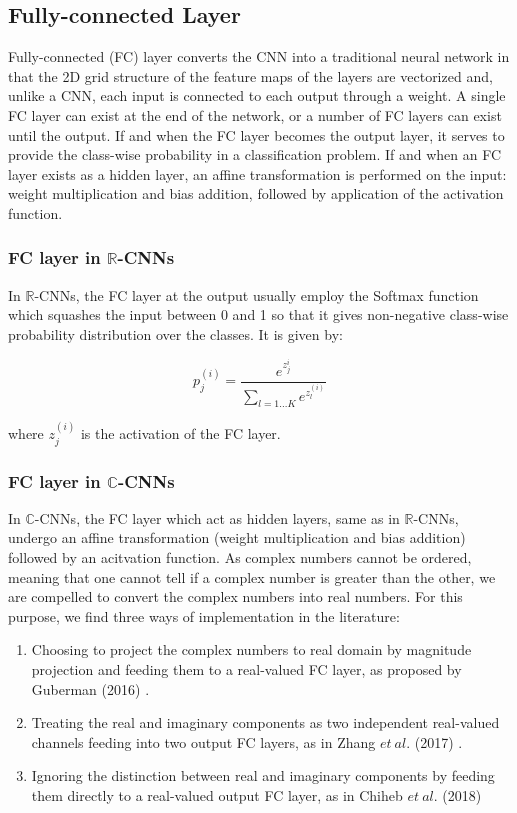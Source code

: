  \subsection{Fully-connected Layer}
 Fully-connected (FC) layer converts the CNN into a traditional neural network in that the 2D grid structure of the feature maps of the layers are vectorized and, unlike a CNN, each input is connected to each output through a weight. A single FC layer can exist at the end of the network, or a number of FC layers can exist until the output. If and when the FC layer becomes the output layer, it serves to provide the class-wise probability in a classification problem. If and when an FC layer exists as a hidden layer, an affine transformation is performed on the input: weight multiplication and bias addition, followed by application of the activation function.
 
  \subsubsection{FC layer in $\mathbb{R}$-CNNs}
 In $\mathbb{R}$-CNNs, the FC layer at the output usually employ the Softmax function which squashes the input between 0 and 1 so that it gives non-negative class-wise probability distribution over the classes. It is given by:
 
 
 
 \begin{equation} p_j^{(i)}=\frac{e^{z_j^i}}{\underset{l=1...K}{\sum}e^{z_l^{(i)}}} 
 \end{equation}
 
 where $z_j^{(i)}$ is the activation of the FC layer. 

\subsubsection{FC layer in $\mathbb{C}$-CNNs}
In $\mathbb{C}$-CNNs, the FC layer which act as hidden layers, same as in $\mathbb{R}$-CNNs, undergo an affine transformation (weight multiplication and bias addition) followed by an acitvation function. As complex numbers cannot be ordered, meaning that one cannot tell if a complex number is greater than the other, we are compelled to convert the complex numbers into real numbers. For this purpose, we find three ways of implementation in the literature: 
\begin{enumerate}
\item Choosing to project the complex numbers to real domain by magnitude projection and feeding them to a real-valued FC layer, as proposed by Guberman (2016) \cite{Guberman}.
\item Treating the real and imaginary components as two independent real-valued channels feeding into two output FC layers, as in Zhang $et \ al.$ (2017) \cite{polsarzhang2017complex}.
\item Ignoring the distinction between real and imaginary components by feeding them directly to a real-valued output FC layer, as in Chiheb $et \ al.$ (2018) \cite{trabelsi2018deep} 
\end{enumerate}


